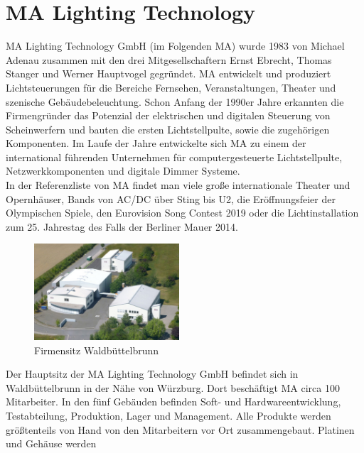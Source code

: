 \documentclass[11pt]{scrartcl}
\begin{document}
\section{MA Lighting Technology}
MA Lighting Technology GmbH (im Folgenden MA) wurde 1983 von Michael Adenau zusammen mit
den drei Mitgesellschaftern Ernst Ebrecht, Thomas Stanger und Werner Hauptvogel gegründet. MA
entwickelt und produziert Lichtsteuerungen für die Bereiche Fernsehen, Veranstaltungen, Theater
und szenische Gebäudebeleuchtung. Schon Anfang der 1990er Jahre erkannten die Firmengründer
das Potenzial der elektrischen und digitalen Steuerung von Scheinwerfern und bauten die ersten
Lichtstellpulte, sowie die zugehörigen Komponenten. Im Laufe der Jahre entwickelte sich MA zu
einem der international führenden Unternehmen für computergesteuerte Lichtstellpulte,
Netzwerkkomponenten und digitale Dimmer Systeme.\\
In der Referenzliste von MA findet man viele große internationale Theater und Opernhäuser, Bands
von AC/DC über Sting bis U2, die Eröffnungsfeier der Olympischen Spiele, den Eurovision Song
Contest 2019 oder die Lichtinstallation zum 25. Jahrestag des Falls der Berliner Mauer 2014.\\
\begin{figure}
    \vspace{-25pt}
    \begin{center}
        \includegraphics[width=0.48\textwidth]{images/csm_MA_building_WBB.jpg}
    \end{center}
    \vspace{-20pt}
    \caption{Firmensitz Waldbüttelbrunn}
    \vspace{-15pt}
\end{figure}
Der Hauptsitz der MA Lighting Technology GmbH befindet sich in Waldbüttelbrunn in der Nähe von
Würzburg. Dort beschäftigt MA circa 100 Mitarbeiter. In den fünf Gebäuden befinden Soft- und
Hardwareentwicklung, Testabteilung, Produktion, Lager und Management. Alle Produkte werden
größtenteils von Hand von den Mitarbeitern vor Ort zusammengebaut. Platinen und Gehäuse werden
\end{document}
